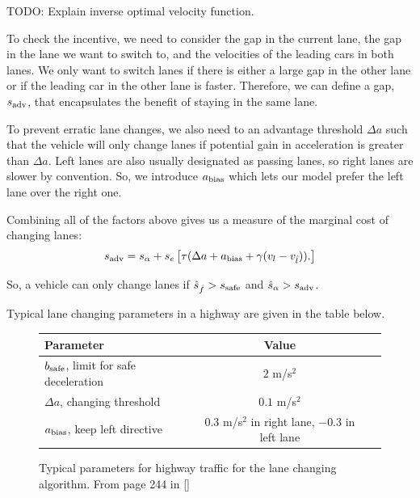 \documentclass[12pt]{article}
\begin{document}
      TODO: Explain inverse optimal velocity function.

      To check the incentive, we need to consider the gap in the current lane, the gap in the lane we want to switch to, and the velocities of the leading cars in both lanes. We only want to switch lanes if there is either a large gap in the other lane or if the leading car in the other lane is faster. Therefore, we can define a gap, $s_{\rm adv}$, that encapsulates the benefit of staying in the same lane. 
      
      To prevent erratic lane changes, we also need to  an advantage threshold $\Delta a$ such that the vehicle will only change lanes if potential gain in acceleration is greater than $\Delta a$.  Left lanes are also usually designated as passing lanes, so right lanes are slower by convention. So, we introduce $a_{\rm bias}$ which lets our model prefer the left lane over the right one. 
      
      Combining all of the factors above gives us a measure of the marginal cost of changing lanes:
      \begin{equation}
        s_{\rm adv} = s_{\alpha} + s_e\left[\tau(\Delta a + a_{\rm bias} + \gamma(v_l - v_{\hat l})).\right]
      \end{equation}

      So, a vehicle can only change lanes if $\hat s_{\hat f} > s_{\rm safe}$ and $\hat s_{\alpha} > s_{\rm adv}$. 

      Typical lane changing parameters in a highway are given in the table below. 
      \begin{figure}[H]
        \begin{center}
          \begin{tabular}{l c c } 
          Parameter & Value \\
          \hline
          $b_{\rm safe}$, limit for safe deceleration & $2$ m/s$^2$ \\
          $\Delta a$, changing threshold & $0.1$ m/s$^2$ \\
          $a_{\rm bias}$, keep left directive & $0.3$ m/s$^2$ in right lane, $-0.3$ in left lane \\

          \end{tabular}
          \end{center}
          \caption{Typical parameters for highway traffic for the lane changing algorithm. From page 244 in [\cite{traffic}]}
      \end{figure}
\end{document}
